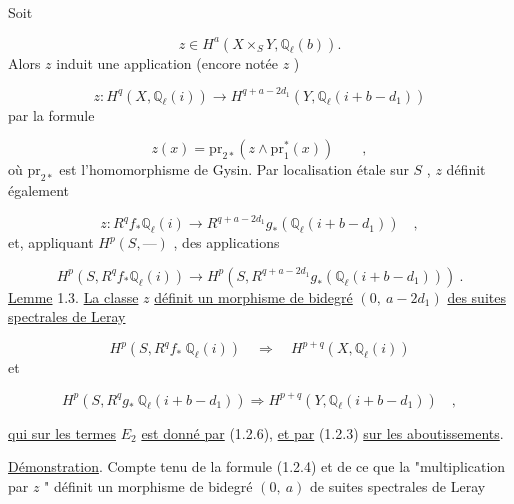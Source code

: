 Soit

\begin{equation}\tag{1.2.2}
z \in H^a(X \times_S Y, \mathbb{Q}_\ell(b)).
\end{equation}
Alors $z$ induit une application (encore notée $z$ )

\begin{equation}\tag{1.2.3}
z : H^q(X, \mathbb{Q}_\ell(i)) \longrightarrow H^{q+a-2d_1} (Y, \mathbb{Q}_\ell(i+b-d_1))
\end{equation}
par la formule

\begin{equation}\tag{1.2.4}
z(x) = \mathrm{pr}_{2*}(z \wedge \mathrm{pr}_1^* (x)) \qquad ,
\end{equation}
où $\mathrm{pr}_{2*}$ est l'homomorphisme de Gysin. Par localisation étale sur $S$ , $z$ définit également

\begin{equation}\tag{1.2.5}
z : R^q f_* \mathbb{Q}_\ell(i) \longrightarrow R^{q+a-2d_1} g_* (\mathbb{Q}_\ell(i+b-d_1)) \quad ,
\end{equation}
et, appliquant $H^p(S, \text{---} )$ , des applications

\begin{equation}\tag{1.2.6}
H^p(S, R^q f_* \mathbb{Q}_\ell(i)) \longrightarrow H^p(S, R^{q+a-2d_1} g_*(\mathbb{Q}_\ell(i+b-d_1))) \ .
\end{equation}
\underline{Lemme} 1.3.  \underline{La classe}  $z$  \underline{définit un morphisme de bidegré} $(0,\ a-2d_1)$ \underline{des suites spectrales de Leray}

\begin{equation}\tag{1.2.7}
H^p(S, R^q f_* \ \mathbb{Q}_\ell(i)) \quad \Rightarrow \quad H^{p+q}(X, \mathbb{Q}_\ell(i))
\end{equation}
et

\begin{equation}\tag{1.2.8}
H^p(S, R^q g_* \ \mathbb{Q}_\ell(i+b-d_1)) \Rightarrow H^{p+q}(Y, \mathbb{Q}_\ell(i+b-d_1)) \quad , 
\end{equation}


 \underline{qui sur les termes} $E_2$ \underline{est donné par} (1.2.6), \underline{et par} (1.2.3) \underline{sur les aboutissements}.

\underline{Démonstration}. Compte tenu de la formule (1.2.4) et de ce que la "multiplication par $z$ " définit un morphisme de bidegré $(0,\ a)$ de suites spectrales de Leray

